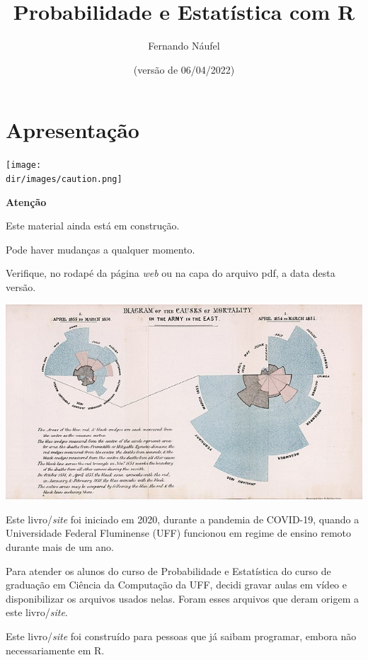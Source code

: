 \documentclass[
  11pt]{report}
\title{Probabilidade e Estatística com R}
\author{Fernando Náufel}
\date{(versão de 06/04/2022)}
\newcommand{\dir}{/ssd/R/x86_64-pc-linux-gnu-library/4.1/fnaufelRmd/rmarkdown/resources}
\newenvironment{rmdcaution}
{
  \begin{mycaution}
    \texttt{[image: \\dir/images/caution.png]}
    \tcblower
  }
  {
  \end{mycaution}
}
\begin{document}
\maketitle

{
\setcounter{tocdepth}{1}
\tableofcontents
}
\hypertarget{apresentacao}{%
\chapter*{Apresentação}\label{apresentacao}}

\begin{rmdcaution}
\textbf{Atenção}

Este material ainda está em construção.

Pode haver mudanças a qualquer momento.

Verifique, no rodapé da página \emph{web} ou na capa do arquivo pdf, a data desta versão.

\end{rmdcaution}

\newpage

\includegraphics{images/640px-Nightingale-mortality.jpg}

\vspace{2cm}

Este livro/\emph{site} foi iniciado em 2020, durante a pandemia de COVID-19, quando a Universidade Federal Fluminense (UFF) funcionou em regime de ensino remoto durante mais de um ano.

Para atender os alunos do curso de Probabilidade e Estatística do curso de graduação em Ciência da Computação da UFF, decidi gravar aulas em vídeo e disponibilizar os arquivos usados nelas. Foram esses arquivos que deram origem a este livro/\emph{site}.

Este livro/\emph{site} foi construído para pessoas que já saibam programar, embora não necessariamente em R.
\end{document}
